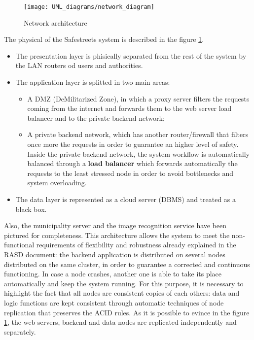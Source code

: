 \begin{figure}[H]
    \centering
    \texttt{[image: UML\_diagrams/network\_diagram]}
    \caption{Network architecture}
    \label{fig:network_diagram}
\end{figure}
The physical of the Safestreets system is described in the figure \ref{fig:network_diagram}. 
\begin{itemize}
    \item The presentation layer is phisically separated from the rest of the system by the LAN routers od users and authorities.
    \item The application layer is splitted in two main areas: 
        \begin{itemize}
            \item A DMZ (DeMilitarized Zone), in which a proxy server filters the requests coming from the internet and forwards them to the web server load balancer and to the private backend network;
            \item A private backend network, which has another router/firewall that filters once more the requests in order to guarantee an higher level of safety. Inside the private backend network, the system workflow is automatically balanced through a \textbf{load balancer} which forwards automatically the requests to the least stressed node in order to avoid bottlenecks and system overloading.
        \end{itemize}
    \item The data layer is represented as a cloud server (DBMS) and treated as a black box.
\end{itemize}
Also, the municipality server and the image recognition service have been pictured for completeness.\newline
This architecture allows the system to meet the non-functional requirements of flexibility and robustness already explained in the RASD document: 
the backend application is distributed on several nodes distributed on the same cluster, in order to guarantee a corrected and continuous functioning. In case a node crashes, another one is able to take its place automatically and keep the system running. For this purpose, it is necessary to highlight the fact that all nodes are consistent copies of each others: data and logic functions are kept consistent through automatic techniques of node replication that preserves the ACID rules.  
\newline As it is possible to evince in the figure \ref{fig:network_diagram}, the web servers, backend and data nodes are replicated independently and separately.
